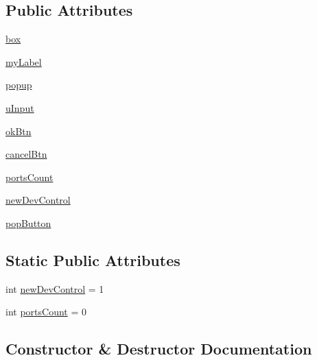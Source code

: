 \subsection*{Public Attributes}
\begin{DoxyCompactItemize}
\item 
\hyperlink{classTestApp1_1_1Setting_a6ab674569a4ad3d7421177f2986602db}{box}
\item 
\hyperlink{classTestApp1_1_1Setting_a9a61551e68453758f35318ab3d816697}{my\+Label}
\item 
\hyperlink{classTestApp1_1_1Setting_a81e1c9b44e01ada3511d867f4e82dd1b}{popup}
\item 
\hyperlink{classTestApp1_1_1Setting_afc9d6674bdc5d0684fee6149b9c0f419}{u\+Input}
\item 
\hyperlink{classTestApp1_1_1Setting_a3649cafab30e4bb5d8b3adf394fe3f73}{ok\+Btn}
\item 
\hyperlink{classTestApp1_1_1Setting_ac670747147062929a8968061e1d6b3de}{cancel\+Btn}
\item 
\hyperlink{classTestApp1_1_1Setting_a2136b22973822bf1b2881f357439d362}{ports\+Count}
\item 
\hyperlink{classTestApp1_1_1Setting_aba15b6c9fc4651a8bfa9495b896873b0}{new\+Dev\+Control}
\item 
\hyperlink{classTestApp1_1_1Setting_a5bca6cb792372d9907922aad1f769eaa}{pop\+Button}
\end{DoxyCompactItemize}
\subsection*{Static Public Attributes}
\begin{DoxyCompactItemize}
\item 
int \hyperlink{classTestApp1_1_1Setting_a1d6a014b27d0b35e08440f82f606ec4a}{new\+Dev\+Control} = 1
\item 
int \hyperlink{classTestApp1_1_1Setting_ac239309579e700d31ce489ed32557200}{ports\+Count} = 0
\end{DoxyCompactItemize}


\subsection{Constructor \& Destructor Documentation}
